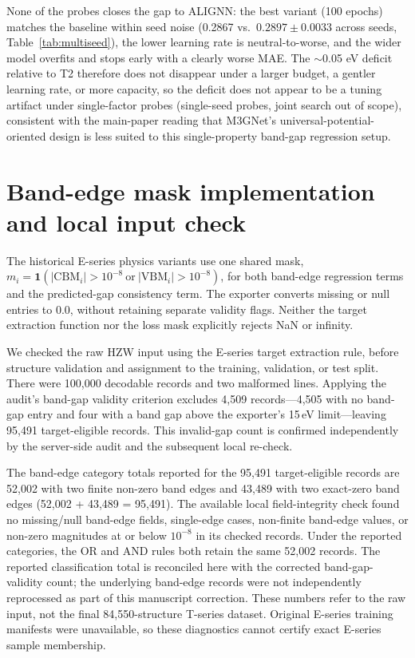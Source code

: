 \documentclass[a4paper,10pt]{article}
\begin{document}
None of the probes closes the gap to ALIGNN: the best variant (100 epochs) matches the baseline within seed noise (0.2867 vs.\ \(0.2897\pm0.0033\) across seeds, Table~\ref{tab:multiseed}), the lower learning rate is neutral-to-worse, and the wider model overfits and stops early with a clearly worse MAE. The \(\sim\)0.05 eV deficit relative to T2 therefore does not disappear under a larger budget, a gentler learning rate, or more capacity, so the deficit does not appear to be a tuning artifact under single-factor probes (single-seed probes, joint search out of scope), consistent with the main-paper reading that M3GNet's universal-potential-oriented design is less suited to this single-property band-gap regression setup.

\section{Band-edge mask implementation and local input check}
\label{sec:si-band-edge-mask}

The historical E-series physics variants use one shared mask,
\(m_i=\mathbf{1}(|\mathrm{CBM}_i|>10^{-8}\ \mathrm{or}\ |\mathrm{VBM}_i|>10^{-8})\),
for both band-edge regression terms and the predicted-gap consistency term.
The exporter converts missing or null entries to 0.0, without retaining
separate validity flags. Neither the target extraction function nor the
loss mask explicitly rejects NaN or infinity.

We checked the raw HZW input using the E-series target extraction rule,
before structure validation and assignment to the training, validation, or test split. There
were 100,000 decodable records and two malformed lines. Applying the
audit's band-gap validity criterion excludes 4,509 records---4,505
with no band-gap entry and four with a band gap above the exporter's
15\,eV limit---leaving 95,491 target-eligible records. This invalid-gap
count is confirmed independently by the server-side audit and the
subsequent local re-check.

The band-edge category totals reported for the 95,491 target-eligible
records are 52,002 with two finite non-zero band edges and 43,489 with
two exact-zero band edges (52,002 + 43,489 = 95,491). The available
local field-integrity check found no missing/null band-edge fields,
single-edge cases, non-finite band-edge values, or non-zero magnitudes
at or below $10^{-8}$ in its checked records. Under the reported
categories, the OR and AND rules both retain the same 52,002 records.
The reported classification total is reconciled here with the corrected
band-gap-validity count; the underlying band-edge records were not
independently reprocessed as part of this manuscript correction. These
numbers refer to the raw input, not the final 84,550-structure T-series
dataset. Original E-series training manifests were unavailable, so
these diagnostics cannot certify exact E-series sample membership.
\end{document}
